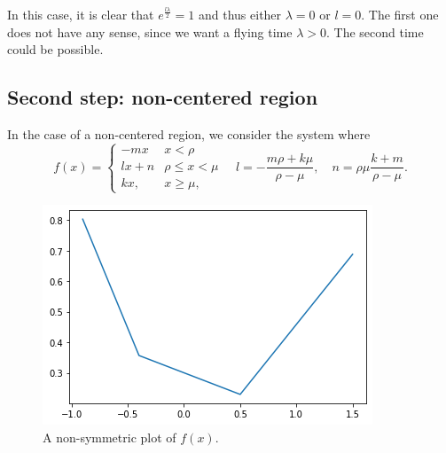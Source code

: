 \documentclass[a4paper,preprint,11pt]{article}
\begin{document}
In this case, it is clear that $e^{\frac{l\lambda}{2}}=1$ and thus either $\lambda=0$ or $l=0$. The first one does not have any sense, since we want a flying time $\lambda>0$. The second time could be possible.









\subsection{Second step: non-centered region}
In the case of a non-centered region, we consider the system where
$$
f(x) = 
\left\{
\begin{array}{cc}
-mx & x<\rho  \\
lx+n & \rho\leq x<\mu \\
kx, & x\geq \mu,
\end{array}
\right. \quad
l = -\frac{m\rho+k\mu}{\rho-\mu}, \quad
n = \rho\mu\frac{k+m}{\rho-\mu}.
$$
\begin{figure}[h]
    \centering
    \includegraphics[scale=0.6]{Slow_Passage/f_no_centrat.png}
    \caption{A non-symmetric plot of $f(x)$.}
    \label{fig:f_no_centrat}
\end{figure}
\end{document}
